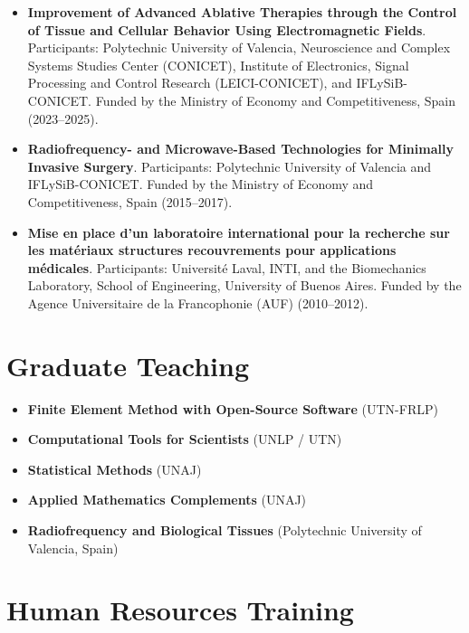 \documentclass[11pt]{article}
\begin{document}
\begin{itemize}[leftmargin=*]
 \item \textbf{Improvement of Advanced Ablative Therapies through the Control of Tissue and Cellular Behavior Using Electromagnetic Fields}.
Participants: Polytechnic University of Valencia, Neuroscience and Complex Systems Studies Center (CONICET), Institute of Electronics, Signal Processing and Control Research (LEICI-CONICET), and IFLySiB-CONICET.
Funded by the Ministry of Economy and Competitiveness, Spain (2023--2025).

\item \textbf{Radiofrequency- and Microwave-Based Technologies for Minimally Invasive Surgery}.
Participants: Polytechnic University of Valencia and IFLySiB-CONICET.
Funded by the Ministry of Economy and Competitiveness, Spain (2015--2017).

\item \textbf{Mise en place d’un laboratoire international pour la recherche sur les matériaux structures recouvrements pour applications médicales}.
Participants: Université Laval, INTI, and the Biomechanics Laboratory, School of Engineering, University of Buenos Aires.
Funded by the Agence Universitaire de la Francophonie (AUF) (2010--2012).

\end{itemize}


\section*{Graduate Teaching}

\begin{itemize}[leftmargin=*]
    \item \textbf{Finite Element Method with Open-Source Software} (UTN-FRLP)
    \item \textbf{Computational Tools for Scientists} (UNLP / UTN)
    \item \textbf{Statistical Methods} (UNAJ)
    \item \textbf{Applied Mathematics Complements} (UNAJ)
    \item \textbf{Radiofrequency and Biological Tissues} (Polytechnic University of Valencia, Spain)
\end{itemize}

\section*{Human Resources Training}
\end{document}
